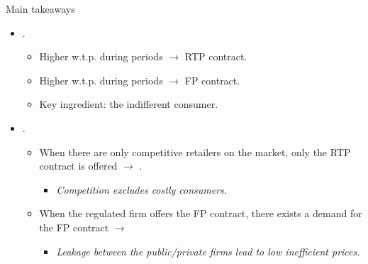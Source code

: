\documentclass{class}
\begin{document}

\begin{frame}{Main takeaways}


\begin{itemize}

\item {}.

\vfill

\begin{itemize} 
    \item Higher w.t.p. during  periods $\rightarrow$ RTP contract.\vfill
    \item Higher w.t.p. during  periods $\rightarrow$ FP contract.\vfill
    \item Key ingredient: the indifferent consumer. 
\end{itemize}

\vfill

\item {}.

\vfill

\begin{itemize}
    \item When there are only competitive retailers on the market, only the RTP contract is offered $\rightarrow$ . \vfill

    \begin{itemize}
        \item \textit{Competition excludes costly consumers.} \vfill
    \end{itemize}
    \item When the regulated firm offers the FP contract, there exists a demand for the FP contract $\rightarrow$  \vfill

    \begin{itemize}
        \item \textit{Leakage between the public/private firms lead to low inefficient prices.} 
    \end{itemize}
\end{itemize}



\end{itemize}


\end{frame}
\end{document}
